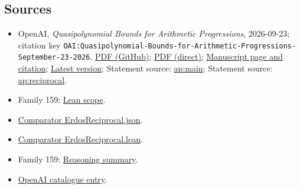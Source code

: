 \documentclass[11pt]{article}
\begin{document}
\subsection{Sources}
\begin{itemize}
\item OpenAI, \emph{Quasipolynomial Bounds for Arithmetic Progressions}, 2026-09-23; citation key \texttt{OAI:Quasipolynomial-Bounds-for-Arithmetic-Progressions-September-23-2026}. \href{https://github.com/openai/math/blob/adc7f1241b42e322a6451854ab7e4b4c146bf78a/preprints/Quasipolynomial-Bounds-for-Arithmetic-Progressions-September-23-2026/paper.pdf}{PDF (GitHub)}; \href{https://github.com/openai/math/raw/adc7f1241b42e322a6451854ab7e4b4c146bf78a/preprints/Quasipolynomial-Bounds-for-Arithmetic-Progressions-September-23-2026/paper.pdf}{PDF (direct)}; \href{https://github.com/openai/math/blob/adc7f1241b42e322a6451854ab7e4b4c146bf78a/preprints/Quasipolynomial-Bounds-for-Arithmetic-Progressions-September-23-2026/README.md}{Manuscript page and citation}; \href{https://github.com/openai/math/blob/main/preprints/Quasipolynomial-Bounds-for-Arithmetic-Progressions-September-23-2026/paper.pdf}{Latest version}; Statement source: \href{https://github.com/openai/math/blob/adc7f1241b42e322a6451854ab7e4b4c146bf78a/preprints/Quasipolynomial-Bounds-for-Arithmetic-Progressions-September-23-2026/build/sections/00-introduction.tex\#L13}{ap:main}; Statement source: \href{https://github.com/openai/math/blob/adc7f1241b42e322a6451854ab7e4b4c146bf78a/preprints/Quasipolynomial-Bounds-for-Arithmetic-Progressions-September-23-2026/build/sections/00-introduction.tex\#L32}{ap:reciprocal}.
\item Family 159: \href{https://github.com/openai/math/blob/adc7f1241b42e322a6451854ab7e4b4c146bf78a/lean/docs/159.md}{Lean scope}.
\item \href{https://github.com/openai/math/blob/adc7f1241b42e322a6451854ab7e4b4c146bf78a/lean/ComparatorChallenges/ErdosReciprocal.json}{Comparator ErdosReciprocal.json}.
\item \href{https://github.com/openai/math/blob/adc7f1241b42e322a6451854ab7e4b4c146bf78a/lean/ComparatorChallenges/ErdosReciprocal.lean}{Comparator ErdosReciprocal.lean}.
\item Family 159: \href{https://github.com/openai/math/blob/adc7f1241b42e322a6451854ab7e4b4c146bf78a/reasoning\_traces/quasipolynomial-arithmetic-progressions.pdf}{Reasoning summary}.
\item \href{https://github.com/openai/math/blob/adc7f1241b42e322a6451854ab7e4b4c146bf78a/CONTENTS.md}{OpenAI catalogue entry}.
\end{itemize}
\end{document}
